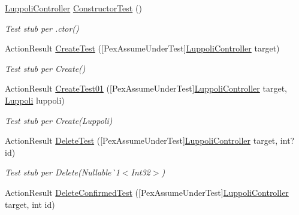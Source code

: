 \begin{DoxyCompactItemize}
\item 
\mbox{\hyperlink{class_brew_day2_1_1_controllers_1_1_luppoli_controller}{Luppoli\+Controller}} \mbox{\hyperlink{class_brew_day2_1_1_controllers_1_1_tests_1_1_luppoli_controller_test_a9decf933413d98c33f26fa27340cbcdc}{Constructor\+Test}} ()
\begin{DoxyCompactList}\small\item\em Test stub per .ctor()\end{DoxyCompactList}\item 
Action\+Result \mbox{\hyperlink{class_brew_day2_1_1_controllers_1_1_tests_1_1_luppoli_controller_test_ac49fe554baae82d0db8f6d67961482e4}{Create\+Test}} (\mbox{[}Pex\+Assume\+Under\+Test\mbox{]}\mbox{\hyperlink{class_brew_day2_1_1_controllers_1_1_luppoli_controller}{Luppoli\+Controller}} target)
\begin{DoxyCompactList}\small\item\em Test stub per Create()\end{DoxyCompactList}\item 
Action\+Result \mbox{\hyperlink{class_brew_day2_1_1_controllers_1_1_tests_1_1_luppoli_controller_test_ac1cfc6c36411d15c90db816e89bc5514}{Create\+Test01}} (\mbox{[}Pex\+Assume\+Under\+Test\mbox{]}\mbox{\hyperlink{class_brew_day2_1_1_controllers_1_1_luppoli_controller}{Luppoli\+Controller}} target, \mbox{\hyperlink{class_brew_day2_1_1_models_1_1_luppoli}{Luppoli}} luppoli)
\begin{DoxyCompactList}\small\item\em Test stub per Create(\+Luppoli)\end{DoxyCompactList}\item 
Action\+Result \mbox{\hyperlink{class_brew_day2_1_1_controllers_1_1_tests_1_1_luppoli_controller_test_ada1bab5c4e27208a6a750905e883e38b}{Delete\+Test}} (\mbox{[}Pex\+Assume\+Under\+Test\mbox{]}\mbox{\hyperlink{class_brew_day2_1_1_controllers_1_1_luppoli_controller}{Luppoli\+Controller}} target, int? id)
\begin{DoxyCompactList}\small\item\em Test stub per Delete(Nullable\`{}1$<$Int32$>$)\end{DoxyCompactList}\item 
Action\+Result \mbox{\hyperlink{class_brew_day2_1_1_controllers_1_1_tests_1_1_luppoli_controller_test_af803753933fa4e76f7b91c5bba9d4e0b}{Delete\+Confirmed\+Test}} (\mbox{[}Pex\+Assume\+Under\+Test\mbox{]}\mbox{\hyperlink{class_brew_day2_1_1_controllers_1_1_luppoli_controller}{Luppoli\+Controller}} target, int id)

\end{DoxyCompactItemize}
